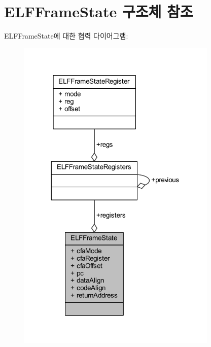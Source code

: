 \hypertarget{struct_e_l_f_frame_state}{}\section{E\+L\+F\+Frame\+State 구조체 참조}
\label{struct_e_l_f_frame_state}


E\+L\+F\+Frame\+State에 대한 협력 다이어그램\+:\nopagebreak
\begin{figure}[H]
\begin{center}
\leavevmode
\includegraphics[width=270pt]{struct_e_l_f_frame_state__coll__graph}
\end{center}
\end{figure}

